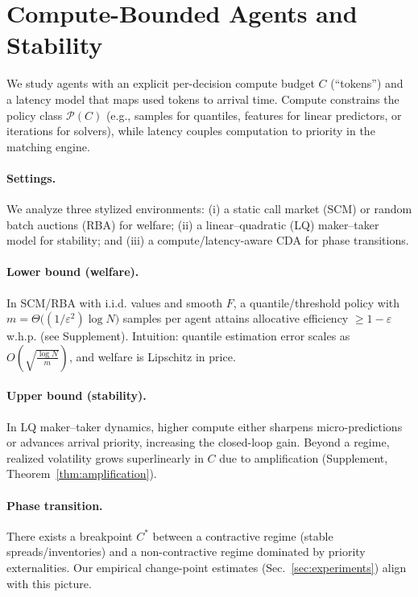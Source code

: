 \section{Compute-Bounded Agents and Stability}
\label{sec:theory}

We study agents with an explicit per-decision compute budget $C$ (``tokens'') and a latency model that maps used tokens to arrival time. Compute constrains the policy class $\mathcal{P}(C)$ (e.g., samples for quantiles, features for linear predictors, or iterations for solvers), while latency couples computation to priority in the matching engine.

\paragraph{Settings.} We analyze three stylized environments: (i) a static call market (SCM) or random batch auctions (RBA) for welfare; (ii) a linear–quadratic (LQ) maker–taker model for stability; and (iii) a compute/latency-aware CDA for phase transitions.

\paragraph{Lower bound (welfare).} In SCM/RBA with i.i.d. values and smooth $F$, a quantile/threshold policy with $m=\Theta\big((1/\varepsilon^2)\log N\big)$ samples per agent attains allocative efficiency $\ge 1-\varepsilon$ w.h.p. (see Supplement). Intuition: quantile estimation error scales as $O\!\left(\sqrt{\tfrac{\log N}{m}}\right)$, and welfare is Lipschitz in price.

\paragraph{Upper bound (stability).} In LQ maker–taker dynamics, higher compute either sharpens micro-predictions or advances arrival priority, increasing the closed-loop gain. Beyond a regime, realized volatility grows superlinearly in $C$ due to amplification (Supplement, Theorem~\ref{thm:amplification}).

\paragraph{Phase transition.} There exists a breakpoint $C^*$ between a contractive regime (stable spreads/inventories) and a non-contractive regime dominated by priority externalities. Our empirical change-point estimates (Sec.~\ref{sec:experiments}) align with this picture.

